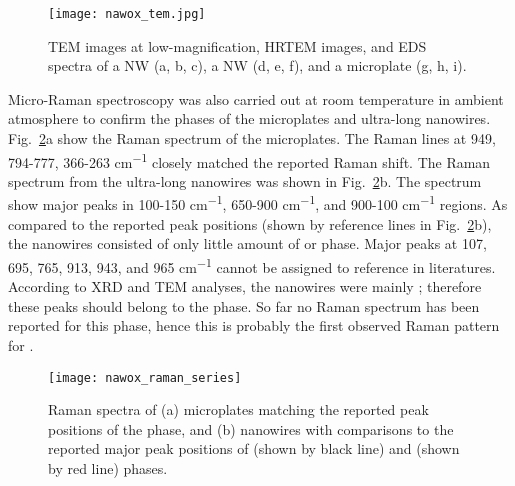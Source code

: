 \begin{figure}[htb]
\centering
\texttt{[image: nawox\_tem.jpg]}
\caption[TEM analyses on sodium tungsten oxides sample]{TEM images at low-magnification, HRTEM images, and EDS spectra of a  NW (a, b, c), a  NW (d, e, f), and a  microplate (g, h, i).}
\label{fig:nawoxtem}
\end{figure}

Micro-Raman spectroscopy was also carried out at room temperature in ambient atmosphere to confirm the phases of the microplates and ultra-long nanowires. Fig.~\ref{fig:nawoxram}a show the Raman spectrum of the microplates. The Raman lines at 949, 794-777, 366-263 \si{cm^{-1}} closely matched the reported  Raman shift.\cite{Fomichev1992} The Raman spectrum from the ultra-long nanowires was shown in Fig.~\ref{fig:nawoxram}b. The spectrum show major peaks in 100-150 \si{cm^{-1}}, 650-900 \si{cm^{-1}}, and 900-100 \si{cm^{-1}} regions. As compared to the reported peak positions (shown by reference lines in Fig.~\ref{fig:nawoxram}b), the nanowires consisted of only little amount of  or  phase. Major peaks at 107, 695, 765, 913, 943, and 965 \si{cm^{-1}} cannot be assigned to reference in literatures. According to XRD and TEM analyses, the nanowires were mainly ; therefore these peaks should belong to the  phase. So far no Raman spectrum has been reported for this phase, hence this is probably the first observed Raman pattern for .
\begin{figure}[htb]
\centering
\texttt{[image: nawox\_raman\_series]}
\caption[Raman spectra on sodium tungsten oxides sample]{Raman spectra of (a) microplates matching the reported peak positions of the  phase, and (b) nanowires with comparisons to the reported major peak positions of  (shown by black line) and  (shown by red line) phases.}
\label{fig:nawoxram}
\end{figure}

